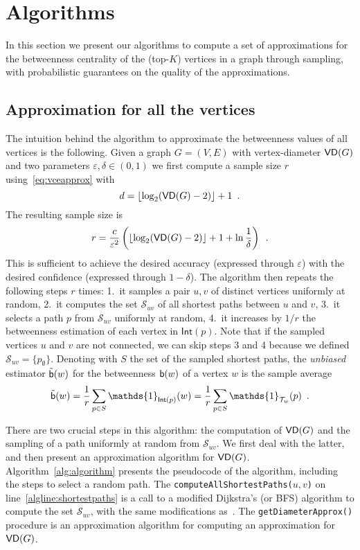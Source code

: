 \section{Algorithms}\label{sec:algo}
In this section we present our algorithms to compute a set of approximations for the
betweenness centrality of the (top-$K$) vertices in a graph through sampling,
with probabilistic guarantees on the quality of the approximations.

\subsection{Approximation for all the vertices}\label{sec:allvertapprox}
The intuition behind the algorithm to approximate the betweenness values of all
vertices is the following. Given a graph $G=(V,E)$
with vertex-diameter $\mathsf{VD}(G)$ and two parameters $\varepsilon,\delta\in(0,1)$
we first compute a sample size $r$ using~\eqref{eq:vceapprox} with
\[d=\lfloor\log_2(\mathsf{VD}(G)-2)\rfloor+1\enspace.\]
The resulting sample size is
\begin{equation}\label{eq:samplesize}
r=\frac{c}{\varepsilon^2}\left(\lfloor\log_2(\VD(G)-2)\rfloor+1+\ln\frac{1}{\delta}\right)\enspace.
\end{equation}
This is sufficient to achieve the desired accuracy
(expressed through $\varepsilon$) with the desired confidence (expressed through
$1-\delta$). The algorithm then repeats the following steps $r$ times:
1.~it samples a pair $u,v$ of distinct vertices uniformly at random, 2.~it
computes the set $\mathcal{S}_{uv}$ of all shortest paths between $u$ and $v$,
3.~it selects a path $p$ from $\mathcal{S}_{uv}$ uniformly at random, 4.~it
increases by $1/r$ the betweenness estimation of each vertex in
$\mathsf{Int}(p)$. Note that if the sampled vertices $u$ and $v$ are not
connected, we can skip steps 3 and 4 because we defined
$\mathcal{S}_{uv}=\{p_\emptyset\}$. Denoting with $S$ the set of the sampled
shortest paths, the \emph{unbiased} estimator $\tilde{\mathsf{b}}(w)$ for the betweenness
$\mathsf{b}(w)$ of a vertex $w$ is the sample average 
\[
\tilde\betw(w) = \frac{1}{r}\sum_{p\in S}
\mathds{1}_{\mathsf{Int}(p)}(w) = \frac{1}{r}\sum_{p\in S}
\mathds{1}_{\mathcal{T}_w}(p)\enspace.
\]

There are two crucial steps in this algorithm: the computation of $\mathsf{VD}(G)$ and
the sampling of a path uniformly at random from $\mathcal{S}_{uv}$. We first
deal with the latter, and then present an approximation algorithm for $\mathsf{VD}(G)$.
Algorithm~\ref{alg:algorithm} presents the pseudocode of the algorithm,
including the steps to select a random path.  The
\texttt{computeAllShortestPaths(}$u,v$\texttt{)}  on
line~\ref{algline:shortestpaths} is a call to a modified Dijkstra's (or BFS)
algorithm to compute the set $\mathcal{S}_{uv}$, with the same modifications
as~\citep{Brandes01}. The \texttt{getDiameterApprox()} procedure is an
approximation algorithm for computing an approximation for $\mathsf{VD}(G)$. %

